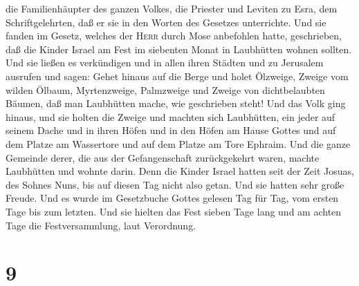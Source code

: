 die Familienhäupter des ganzen Volkes, die Priester und Leviten zu Esra,
dem Schriftgelehrten, daß er sie in den Worten des Gesetzes unterrichte.
 Und sie fanden im Gesetz, welches der \textsc{Herr}
durch Mose anbefohlen hatte, geschrieben, daß die Kinder Israel am Fest
im siebenten Monat in Laubhütten wohnen sollten.  Und sie
ließen es verkündigen und in allen ihren Städten und zu Jerusalem
ausrufen und sagen: Gehet hinaus auf die Berge und holet Ölzweige,
Zweige vom wilden Ölbaum, Myrtenzweige, Palmzweige und Zweige von
dichtbelaubten Bäumen, daß man Laubhütten mache, wie geschrieben steht!
 Und das Volk ging hinaus, und sie holten die Zweige und
machten sich Laubhütten, ein jeder auf seinem Dache und in ihren Höfen
und in den Höfen am Hause Gottes und auf dem Platze am Wassertore und
auf dem Platze am Tore Ephraim.  Und die ganze Gemeinde
derer, die aus der Gefangenschaft zurückgekehrt waren, machte Laubhütten
und wohnte darin. Denn die Kinder Israel hatten seit der Zeit Josuas,
des Sohnes Nuns, bis auf diesen Tag nicht also getan. Und sie hatten
sehr große Freude.  Und es wurde im Gesetzbuche Gottes
gelesen Tag für Tag, vom ersten Tage bis zum letzten. Und sie hielten
das Fest sieben Tage lang und am achten Tage die Festversammlung, laut
Verordnung.

\hypertarget{section-8}{%
\section{9}\label{section-8}}

